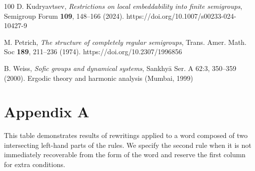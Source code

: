 \documentclass{article}
\theoremstyle{definition}
\begin{document}
\begin{thebibliography}{100}
 D. Kudryavtsev, {\em Restrictions on local embeddability into finite semigroups}, Semigroup Forum {\bf 109}, 148--166 (2024). https://doi.org/10.1007/s00233-024-10427-9

 M. Petrich, {\em The structure of completely regular semigroups}, Trans. Amer. Math. Soc {\bf 189}, 211--236 (1974). https://doi.org/10.2307/1996856

 B. Weiss, {\em Sofic groups and dynamical systems}, Sankhy\={a} Ser. A 62:3, 350--359 (2000). Ergodic theory and harmonic analysis (Mumbai, 1999)
\end{thebibliography}


\newpage

\section*{Appendix A}

This table demonstrates results of rewritings applied to a word composed of two intersecting left-hand parts of the rules. We specify the second rule when it is not immediately recoverable from the form of the word and reserve the first column for extra conditions.
\end{document}
